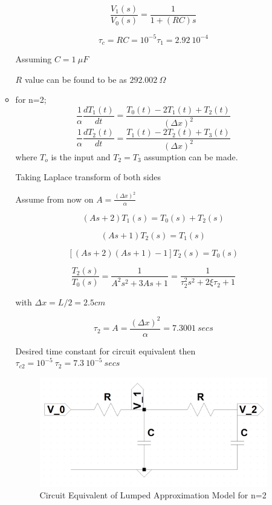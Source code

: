 \documentclass[a4paper,12pt]{article}
\begin{document}
\begin{enumerate}
\begin{itemize}
				$$ \frac{V_1(s)}{V_0(s)}=\frac{1}{1+(RC)s}$$
				
				$$ \tau_c=RC=10^{-5}\tau_1=2.92\ 10^{-4}$$
				
				Assuming $C=1\ \mu F$
				
				$R$ value can be found to be as $292.002\ \Omega$
				
			\item for n=2;
				$$ \frac{1}{\alpha}\frac{dT_1(t)}{dt}=\frac{T_0(t)-2T_1(t)+T_2(t)}{{(\Delta x)}^2}	$$		
				$$ \frac{1}{\alpha}\frac{dT_2(t)}{dt}=\frac{T_1(t)-2T_2(t)+T_3(t)}{{(\Delta x)}^2}	$$		
				where $T_o$ is the input and $T_2=T_3$ assumption can be made.
				
				Taking Laplace transform of both sides
				
				Assume from now on $A=\frac{{(\Delta x)}^2}{\alpha}$
				
				$$ (As+2)T_1(s)=T_0(s)+T_2(s)$$
				
				$$ (As+1)T_2(s)=T_1(s)$$
				
				$$ [(As+2)(As+1)-1]T_2(s)=T_0(s) $$
				
				$$ \frac{T_2(s)}{T_0(s)}=\frac{1}{A^2s^2+3As+1}=\frac{1}{\tau_2^2s^2+ 2 \xi \tau_2 +1} $$
	
				with $\Delta x=L/2=2.5 cm$
								
				$$ \tau_2=A= \frac{{(\Delta x)}^2}{\alpha} = 7.3001\ secs $$
				
				Desired time constant for circuit equivalent then $\tau_{c2}=10^{-5}\ \tau_2=7.3\ 10^{-5}\ secs$ 
				
				\begin{figure}[H]
					\center
					\setlength{\unitlength}{\textwidth} 
					\includegraphics[width=0.6\unitlength]{images/pre2b}
					\caption{\label{fig:pre2b} Circuit Equivalent of Lumped Approximation Model for n=2}
				\end{figure}
				


\end{itemize}
\end{enumerate}
\end{document}
